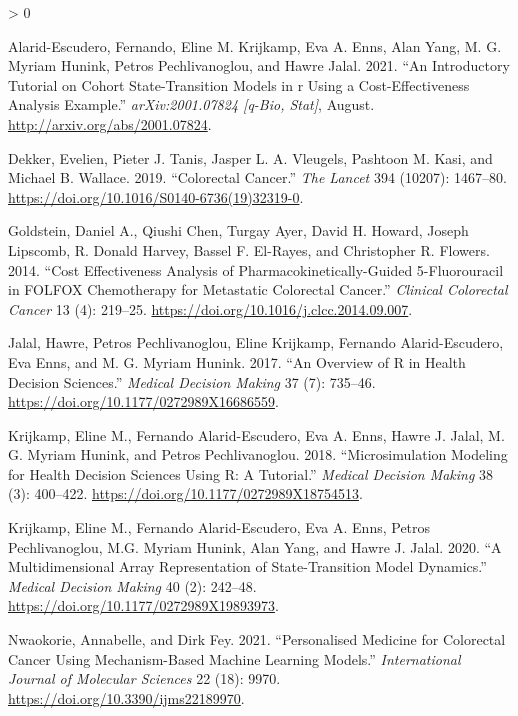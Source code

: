 \documentclass[
]{article}
\newlength{\cslhangindent}
\newenvironment{CSLReferences}[2] %
 {%
  \setlength{\parindent}{0pt}
  \ifodd #1 \everypar{\setlength{\hangindent}{\cslhangindent}}\ignorespaces\fi
  \ifnum #2 > 0
  \setlength{\parskip}{#2\baselineskip}
  \fi
 }%
 {}
\begin{document}
\hypertarget{refs}{}
\begin{CSLReferences}{1}{0}
\leavevmode\hypertarget{ref-alarid-escudero2021}{}%
Alarid-Escudero, Fernando, Eline M. Krijkamp, Eva A. Enns, Alan Yang, M.
G. Myriam Hunink, Petros Pechlivanoglou, and Hawre Jalal. 2021. {``An
Introductory Tutorial on Cohort State-Transition Models in r Using a
Cost-Effectiveness Analysis Example.''} \emph{arXiv:2001.07824 {[}q-Bio,
Stat{]}}, August. \url{http://arxiv.org/abs/2001.07824}.

\leavevmode\hypertarget{ref-dekker2019}{}%
Dekker, Evelien, Pieter J. Tanis, Jasper L. A. Vleugels, Pashtoon M.
Kasi, and Michael B. Wallace. 2019. {``Colorectal Cancer.''} \emph{The
Lancet} 394 (10207): 1467--80.
\url{https://doi.org/10.1016/S0140-6736(19)32319-0}.

\leavevmode\hypertarget{ref-goldstein2014}{}%
Goldstein, Daniel A., Qiushi Chen, Turgay Ayer, David H. Howard, Joseph
Lipscomb, R. Donald Harvey, Bassel F. El-Rayes, and Christopher R.
Flowers. 2014. {``Cost Effectiveness Analysis of
Pharmacokinetically-Guided 5-Fluorouracil in FOLFOX Chemotherapy for
Metastatic Colorectal Cancer.''} \emph{Clinical Colorectal Cancer} 13
(4): 219--25. \url{https://doi.org/10.1016/j.clcc.2014.09.007}.

\leavevmode\hypertarget{ref-jalal2017}{}%
Jalal, Hawre, Petros Pechlivanoglou, Eline Krijkamp, Fernando
Alarid-Escudero, Eva Enns, and M. G. Myriam Hunink. 2017. {``An Overview
of R in Health Decision Sciences.''} \emph{Medical Decision Making} 37
(7): 735--46. \url{https://doi.org/10.1177/0272989X16686559}.

\leavevmode\hypertarget{ref-krijkamp2018}{}%
Krijkamp, Eline M., Fernando Alarid-Escudero, Eva A. Enns, Hawre J.
Jalal, M. G. Myriam Hunink, and Petros Pechlivanoglou. 2018.
{``Microsimulation Modeling for Health Decision Sciences Using R: A
Tutorial.''} \emph{Medical Decision Making} 38 (3): 400--422.
\url{https://doi.org/10.1177/0272989X18754513}.

\leavevmode\hypertarget{ref-krijkamp2020}{}%
Krijkamp, Eline M., Fernando Alarid-Escudero, Eva A. Enns, Petros
Pechlivanoglou, M.G. Myriam Hunink, Alan Yang, and Hawre J. Jalal. 2020.
{``A Multidimensional Array Representation of State-Transition Model
Dynamics.''} \emph{Medical Decision Making} 40 (2): 242--48.
\url{https://doi.org/10.1177/0272989X19893973}.

\leavevmode\hypertarget{ref-nwaokorie2021}{}%
Nwaokorie, Annabelle, and Dirk Fey. 2021. {``Personalised Medicine for
Colorectal Cancer Using Mechanism-Based Machine Learning Models.''}
\emph{International Journal of Molecular Sciences} 22 (18): 9970.
\url{https://doi.org/10.3390/ijms22189970}.


\end{CSLReferences}
\end{document}

